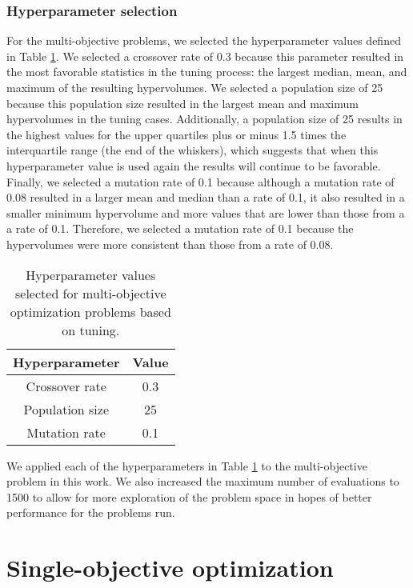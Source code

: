 \subsubsection{Hyperparameter selection}
For the multi-objective problems, we selected the hyperparameter 
values defined in Table \ref{tab:moga_parameters}. We selected 
a crossover rate of 0.3 because this parameter resulted in the 
most favorable statistics in the tuning process: the largest 
median, mean, and maximum of the resulting hypervolumes. We selected 
a population size of 25 because this population size resulted in 
the largest mean and maximum hypervolumes in the tuning cases. 
Additionally, a population size of 25 results in the highest 
values for the upper quartiles plus or minus 1.5 times the interquartile 
range (the end of the whiskers), which suggests that when this 
hyperparameter value is used again the results will continue to be 
favorable. Finally, we selected a mutation rate of 0.1 because 
although a mutation rate of 0.08 resulted in a larger mean and median 
than a rate of 0.1, it also resulted in a smaller minimum hypervolume and 
more values that are lower than those from a a rate of 0.1. Therefore, we 
selected a mutation rate of 0.1 because the hypervolumes were more 
consistent than those from a rate of 0.08. 

\begin{table}
    \centering 
    \caption{Hyperparameter values selected for multi-objective 
    optimization problems based on tuning.}
    \label{tab:moga_parameters}
    \begin{tabular}{c c}
        \hline
        Hyperparameter & Value \\
        \hline
        Crossover rate & 0.3\\
        Population size & 25\\
        Mutation rate & 0.1\\
        \hline
    \end{tabular}
\end{table}

We applied each of the hyperparameters in Table \ref{tab:moga_parameters}
to the multi-objective problem in this work. We also increased the 
maximum number of evaluations to 1500 to allow for more exploration 
of the problem space in hopes of better performance for the problems 
run. 

\section{Single-objective optimization}
